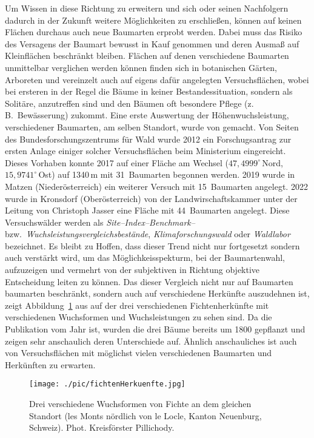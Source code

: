 \documentclass[twocolumn]{scrartcl}
\begin{document}
Um Wissen in diese Richtung zu erweitern und sich oder seinen
Nachfolgern dadurch in der Zukunft weitere Möglichkeiten zu
erschließen, können auf keinen Flächen durchaus auch neue Baumarten
erprobt werden. Dabei muss das Risiko des Versagens der Baumart
bewusst in Kauf genommen und deren Ausmaß auf Kleinflächen beschränkt
bleiben. Flächen auf denen verschiedene Baumarten unmittelbar
verglichen werden können finden sich in botanischen Gärten, Arboreten
und vereinzelt auch auf eigens dafür angelegten Versuchsflächen, wobei
bei ersteren in der Regel die Bäume in keiner Bestandessituation,
sondern als Solitäre, anzutreffen sind und den Bäumen oft besondere
Pflege (z.\,B.\ Bewässerung) zukommt. Eine erste Auswertung der
Höhenwuchsleistung, verschiedener Baumarten, am selben Standort, wurde
von \cite{mayer1970anbauversuch} gemacht. Von Seiten des
Bundesforschungszentrums für Wald wurde 2012 ein Forschugsantrag zur
ersten Anlage einiger solcher Versuchsflächen beim Ministerium
eingereicht. Dieses Vorhaben konnte 2017 auf einer Fläche am Wechsel
($47,4999^{\circ}$\,Nord, $15,9741^{\circ}$\,Ost) auf 1340\,m mit
31~Baumarten begonnen werden. 2019 wurde in Matzen (Niederösterreich)
ein weiterer Versuch mit 15~Baumarten angelegt. 2022 wurde in
Kronsdorf (Oberösterreich) von der Landwirschaftskammer unter der
Leitung von Christoph Jasser eine Fläche mit 44~Baumarten
angelegt. Diese Versuchswälder werden als
\emph{Site--Index--Benchmark--} bzw.\
\emph{Wuchsleistungsvergleichsbestände}, \emph{Klimaforschungswald}
oder \emph{Waldlabor} bezeichnet. Es bleibt zu Hoffen, dass dieser
Trend nicht nur fortgesetzt sondern auch verstärkt wird, um das
Möglichkeisspekturm, bei der Baumartenwahl, aufzuzeigen und vermehrt
von der subjektiven in Richtung objektive Entscheidung leiten zu
können. Das dieser Vergleich nicht nur auf Baumarten baumarten
beschränkt, sondern auch auf verschiedene Herkünfte auszudehnen ist,
zeigt Abbildung~\ref{fig:fichtenHerkuenfte} aus
\citet[S.~86]{hegi1906IllustrierteFloraBd1} auf der drei verschiedenen
Fichtenherkünfte mit verschiedenen Wuchsformen und Wuchsleistungen zu
sehen sind. Da die Publikation vom Jahr
\citeyear{hegi1906IllustrierteFloraBd1} ist, wurden die drei Bäume
bereits um 1800 gepflanzt und zeigen sehr anschaulich deren
Unterschiede auf. Ähnlich anschauliches ist auch von Versuchsflächen
mit möglichst vielen verschiedenen Baumarten und Herkünften zu
erwarten.

\begin{figure}[htbp]
  \centering
  \texttt{[image: ./pic/fichtenHerkuenfte.jpg]}
  \caption{Drei verschiedene Wuchsformen von Fichte an dem gleichen
    Standort (les Monts nördlich von le Locle, Kanton Neuenburg,
    Schweiz). Phot. Kreisförster
    Pillichody. \citep[S.~86]{hegi1906IllustrierteFloraBd1}}
  \label{fig:fichtenHerkuenfte}
\end{figure}
\end{document}
